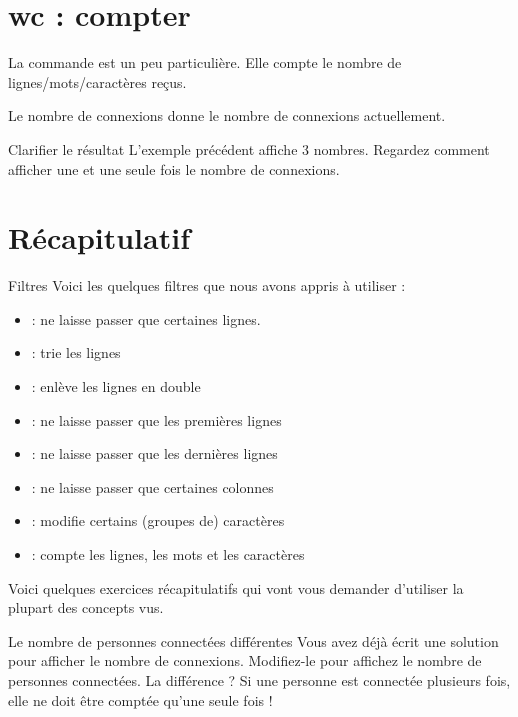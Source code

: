 \documentclass[a4paper,11pt]{style-esi/td}
\begin{document}
	\section{wc : compter}

		La commande  est un peu particulière.
		Elle compte le nombre de lignes/mots/caractères reçus.

		\begin{Exemple}{Le nombre de connexions}
			 donne le nombre de connexions actuellement.
		\end{Exemple}

		\begin{Exercice}{Clarifier le résultat}
			L'exemple précédent affiche 3 nombres.
			Regardez comment afficher une et une seule fois le nombre
			de connexions.
		\end{Exercice}

	\section{Récapitulatif}

		\begin{theorie}{Filtres}
			Voici les quelques filtres que nous avons appris à utiliser :
			\begin{itemize}
				\item {} : ne laisse passer que certaines lignes.
				\item {} : trie les lignes
				\item {} : enlève les lignes en double
				\item {} : ne laisse passer que les premières lignes
				\item {} : ne laisse passer que les dernières lignes
				\item {}  : ne laisse passer que certaines colonnes
				\item {} : modifie certains (groupes de) caractères
				\item {} : compte les lignes, les mots et les caractères
			\end{itemize}
		\end{theorie}
		
		Voici quelques exercices récapitulatifs qui vont vous demander 
		d'utiliser la plupart des concepts vus.

		\begin{Exemple}{Le nombre de personnes connectées différentes}
			Vous avez déjà écrit une solution pour afficher le nombre de connexions.
			Modifiez-le pour affichez le nombre de personnes connectées.
			La différence ? Si une personne est connectée plusieurs fois,
			elle ne doit être comptée qu'une seule fois !
		\end{Exemple}
	
\end{document}
